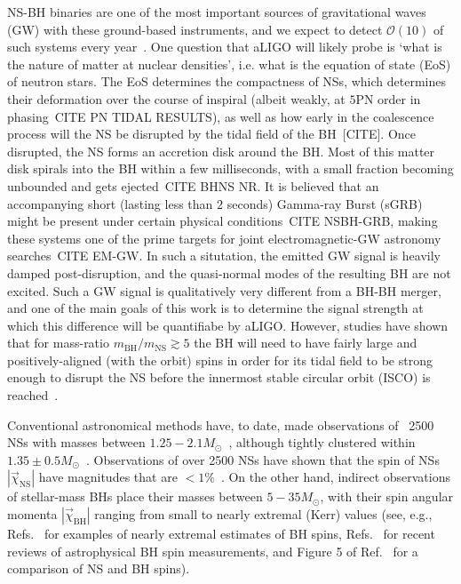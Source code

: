 \documentclass[aps,prd,amsmath,floats,floatfix, twocolumn,
superscriptaddress,nofootinbib,showpacs]{revtex4-1}
\newcommand{\prayush}{\textcolor{red!40!black}}
\newcommand{\mbh}{m_\mathrm{BH}}
\newcommand{\mns}{m_\mathrm{NS}}
\begin{document}
NS-BH binaries are one of the most important sources of gravitational waves (GW)
with these ground-based instruments, and we expect to detect $\mathcal{O}(10)$
of such systems every year~\cite{Abadie:2010cf}. 
%
One question that aLIGO will likely probe is `what is the nature of
matter at nuclear densities', i.e. what is the equation of state (EoS) of 
neutron stars. The EoS determines the compactness of NSs, which determines
their deformation over the course of inspiral (albeit weakly, at $5$PN order in 
phasing~\prayush{CITE PN TIDAL RESULTS}), as well as how early in the coalescence
process will the NS be disrupted by the tidal field of the BH~\prayush{[CITE]}.
Once disrupted,
the NS forms an accretion disk around the BH. Most of this matter disk spirals 
into the BH within a few milliseconds, with a small fraction becoming unbounded
and gets ejected~\prayush{CITE BHNS NR}. It is believed that an accompanying
short (lasting less than $2$ seconds) Gamma-ray Burst (sGRB) might be present
under certain physical conditions~\prayush{CITE NSBH-GRB},
making these systems one of the prime targets for joint electromagnetic-GW
astronomy searches~\prayush{CITE EM-GW}.
In such a situtation, the emitted GW signal
is heavily damped post-disruption, and the quasi-normal modes of the resulting
BH are not excited. Such a GW signal is qualitatively very different from a
BH-BH merger, and one of the main goals of this work is to determine the 
signal strength at which this difference will be quantifiabe by aLIGO.
%
However, studies have shown that for mass-ratio $\mbh/\mns\gtrsim 5$ the BH
will need to have fairly large and positively-aligned (with the orbit) spins
in order for its tidal field to be strong enough to disrupt the NS before the
innermost stable circular orbit (ISCO) is reached~\cite{Foucart:2013psa}.


Conventional astronomical methods have, to date, made observations of ~2500
NSs with masses between $1.25-2.1 M_\odot$~\cite{Lyne:2004cj,
Demorest:2010bx,2013Sci...340..448A,atnfcatalog,mcgillmagnetarcatalog,
stellarcollapsemass}, although
tightly clustered within $1.35\pm0.5M_\odot$~\cite{stellarcollapsemass}.
%
Observations of over 2500 NSs have shown that the spin of NSs
$|\vec{\chi}_\mathrm{NS}|$ have magnitudes that are $<1\%$~\cite{Miller:2014aaa}.
%
On the other hand, indirect observations of stellar-mass BHs place their
masses between $5-35M_\odot$, with their spin angular momenta 
$|\vec{\chi}_\mathrm{BH}|$ ranging from small to nearly extremal (Kerr) values
(see, e.g., Refs.~\cite{McClintockEtAl:2006,Miller:2009cw,Gou:2014una} for 
examples of nearly extremal estimates of BH spins, Refs.~\cite{McClintock:2013vwa,
Reynolds:2013qqa} for recent reviews of astrophysical BH spin measurements,
and Figure 5 of Ref.~\cite{Miller:2014aaa} for a comparison of NS and BH spins).
\end{document}
